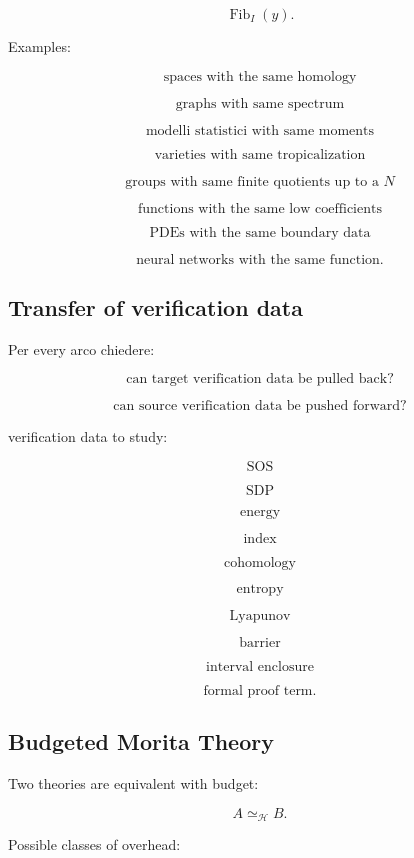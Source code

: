 \documentclass[11pt]{article}
\begin{document}
\[
\operatorname{Fib}_I(y).
\]

Examples:

\[
\text{spaces with the same homology}
\]

\[
\text{graphs with same spectrum}
\]

\[
\text{modelli statistici with same moments}
\]

\[
\text{varieties with same tropicalization}
\]

\[
\text{groups with same finite quotients up to a }N
\]

\[
\text{functions with the same low coefficients}
\]

\[
\text{PDEs with the same boundary data}
\]

\[
\text{neural networks with the same function}.
\]



\subsection{Transfer of verification data}

Per every arco chiedere:

\[
\text{can target verification data be pulled back?}
\]

\[
\text{can source verification data be pushed forward?}
\]

verification data to study:

\[
\text{SOS}
\]

\[
\text{SDP}
\]

\[
\text{energy}
\]

\[
\text{index}
\]

\[
\text{cohomology}
\]

\[
\text{entropy}
\]

\[
\text{Lyapunov}
\]

\[
\text{barrier}
\]

\[
\text{interval enclosure}
\]

\[
\text{formal proof term}.
\]



\subsection{Budgeted Morita Theory}

Two theories are equivalent with budget:

\[
A\simeq_{\mathcal H}B.
\]

Possible classes of overhead:
\end{document}
